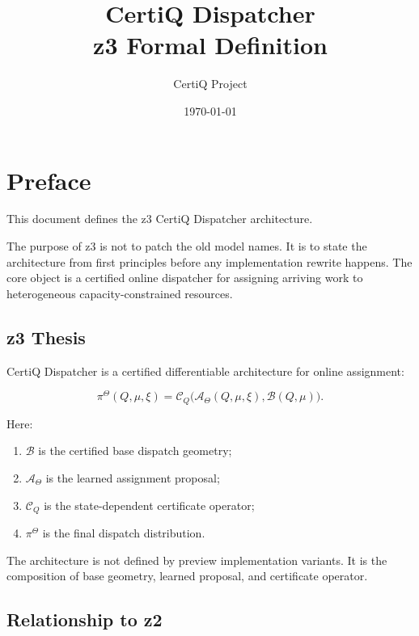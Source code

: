 \documentclass[a4paper,11pt]{article}
\title{\textbf{CertiQ Dispatcher}\\z3 Formal Definition}
\author{CertiQ Project}
\date{\today}
\theoremstyle{definition}
\begin{document}
\maketitle

\tableofcontents
\newpage

\section*{Preface}

This document defines the z3 CertiQ Dispatcher architecture.

The purpose of z3 is not to patch the old model names. It is to state the
architecture from first principles before any implementation rewrite happens.
The core object is a certified online dispatcher for assigning arriving work to
heterogeneous capacity-constrained resources.

\subsection*{z3 Thesis}

CertiQ Dispatcher is a certified differentiable architecture for online
assignment:

\begin{equation}\label{eq:thesis}
\pi^\Theta(Q,\mu,\xi)
=
\mathcal C_Q\bigl(
\mathcal A_\Theta(Q,\mu,\xi),
\mathcal B(Q,\mu)
\bigr).
\end{equation}

Here:
\begin{enumerate}[label=(\roman*)]
  \item \(\mathcal B\) is the certified base dispatch geometry;
  \item \(\mathcal A_\Theta\) is the learned assignment proposal;
  \item \(\mathcal C_Q\) is the state-dependent certificate operator;
  \item \(\pi^\Theta\) is the final dispatch distribution.
\end{enumerate}

The architecture is not defined by preview implementation variants. It is the
composition of base geometry, learned proposal, and certificate operator.

\subsection*{Relationship to z2}
\end{document}
